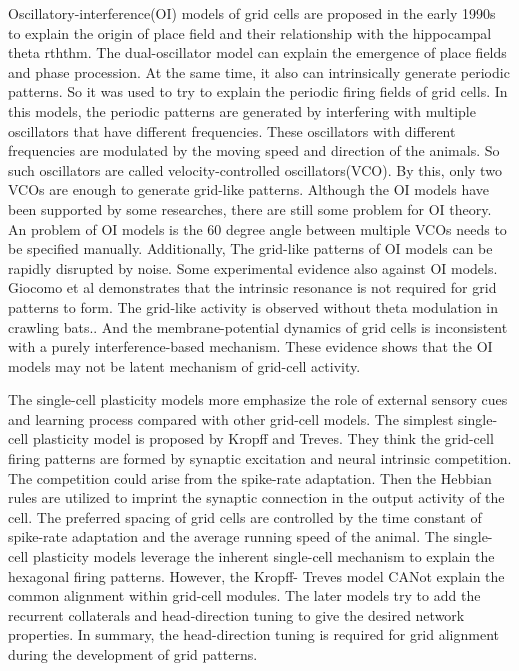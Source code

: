 \documentclass[final,5p,times,twocolumn,authoryear]{elsarticle}
\begin{document}
Oscillatory-interference(OI) models of grid cells are proposed in the early 1990s to explain the origin of place field and their relationship with the hippocampal theta rththm\citep{OKeefe2005,Burgess2007,Hasselmo2007,Pastoll2013,Burgess2008}. The dual-oscillator model can explain the emergence of place fields and phase procession\citep{OKeefe2005}. At the same time, it also can intrinsically generate periodic patterns. So it was used to try to explain the periodic firing fields of grid cells\citep{DAlbis2018}. In this models, the periodic patterns are generated by interfering with multiple oscillators that have different frequencies. These oscillators with different frequencies are modulated by the moving speed and direction of the animals. So such oscillators are called velocity-controlled oscillators(VCO). By this, only two VCOs are enough to generate grid-like patterns. Although the OI models have been supported by some researches\citep{Schmidt-Hieber2013,Domnisoru2013,Welday2011,Koenig2011,Brandon2011,Giocomo2007,Hafting2005,Alonso1989}, there are still some problem for OI theory. An problem of OI models is the 60 degree angle between multiple VCOs needs to be specified manually. Additionally, The grid-like patterns of OI models can be rapidly disrupted by noise\citep{DAlbis2018}. Some experimental evidence also against OI models. Giocomo et al demonstrates that the intrinsic resonance is not required for grid patterns to form\citep{Giocomo2011}. The grid-like activity is observed without theta modulation in crawling bats.\citep{Yartsev2011}. And the membrane-potential dynamics of grid cells is inconsistent with a purely interference-based mechanism\citep{Domnisoru2013}. These evidence shows that the OI models may not be latent mechanism of grid-cell activity\citep{Moser2017}.

The single-cell plasticity models more emphasize the role of external sensory cues and learning process compared with other grid-cell models\citep{DAlbis2018}. The simplest single-cell plasticity model is proposed by Kropff and Treves\citep{Kropff2008}. They think the grid-cell firing patterns are formed by synaptic excitation and neural intrinsic competition. The competition could arise from the spike-rate adaptation. Then the Hebbian rules are utilized to imprint the synaptic connection in the output activity of the cell. The preferred spacing of grid cells are controlled by the time constant of spike-rate adaptation and the average running speed of the animal. The single-cell plasticity models leverage the inherent single-cell mechanism to explain the hexagonal firing patterns. However, the Kropff- Treves model CANot explain the common alignment within grid-cell modules\citep{Hafting2005,Fyhn2008,Stensola2012}. The later models try to add the recurrent collaterals and head-direction tuning\citep{Kropff2008,Si2012} to give the desired network properties. In summary, the head-direction tuning is required for grid alignment during the development of grid patterns\citep{Rowland2016}.  
\end{document}
